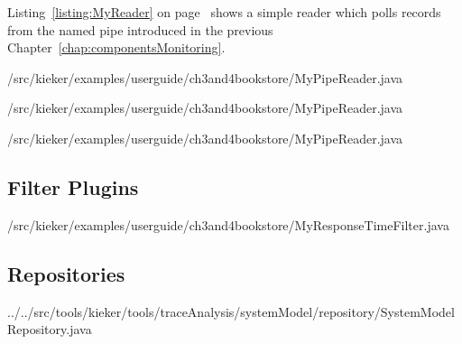 Listing~\ref{listing:MyReader} on page~\pageref{listing:MyReader} shows a simple reader which polls records from %
the named pipe introduced in the previous Chapter~\ref{chap:componentsMonitoring}. %

% 


\setJavaCodeListing
%
{\customComponentsBookstoreApplicationDir/src/kieker/examples/userguide/ch3and4bookstore/MyPipeReader.java}

\setJavaCodeListing
%
{\customComponentsBookstoreApplicationDir/src/kieker/examples/userguide/ch3and4bookstore/MyPipeReader.java}

\setJavaCodeListing
%
{\customComponentsBookstoreApplicationDir/src/kieker/examples/userguide/ch3and4bookstore/MyPipeReader.java}


\subsection{Filter Plugins}\label{sec:analysis:filters}

\setJavaCodeListing
%
{\customComponentsBookstoreApplicationDir/src/kieker/examples/userguide/ch3and4bookstore/MyResponseTimeFilter.java}

\subsection{Repositories}

\setJavaCodeListing
%
{../../src/tools/kieker/tools/traceAnalysis/systemModel/repository/SystemModelRepository.java}

